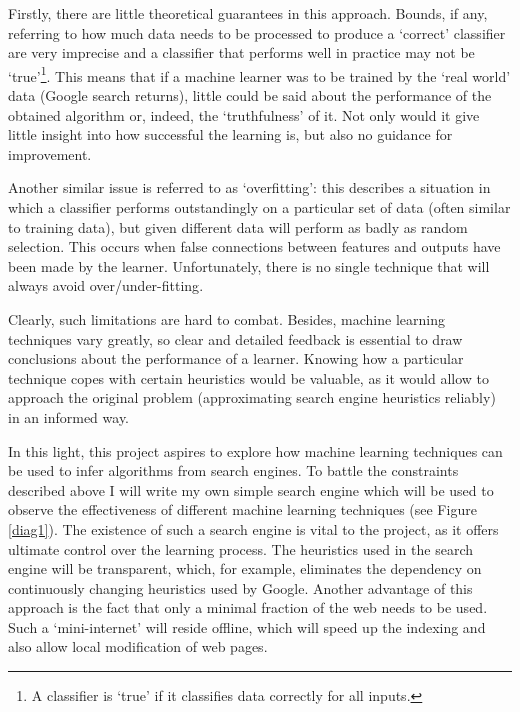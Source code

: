 Firstly, there are little theoretical guarantees in this approach. Bounds, if any, referring to how much data needs to be processed to produce a `correct' classifier are very imprecise and a classifier that performs well in practice may not be `true'\footnote{A classifier is `true' if it classifies data correctly for all inputs.}. This means that if a machine learner was to be trained by the `real world' data (Google search returns), little could be said about the performance of the obtained algorithm or, indeed, the `truthfulness' of it. Not only would it give little insight into how successful the learning is, but also no guidance for improvement. 

Another similar issue is referred to as `overfitting': this describes a situation in which a classifier performs outstandingly on a particular set of data (often similar to training data), but given different data will perform as badly as random selection. This occurs when false connections between features and outputs have been made by the learner. Unfortunately, there is no single technique that will always avoid over/under-fitting\cite{domingos}.

Clearly, such limitations are hard to combat. Besides, machine learning techniques vary greatly, so clear and detailed feedback is essential to draw conclusions about the performance of a learner. Knowing how a particular technique copes with certain heuristics would be valuable, as it would allow to approach the original problem (approximating search engine heuristics reliably) in an informed way.  

In this light, this project aspires to explore how machine learning techniques can be used to infer algorithms from search engines. To battle the constraints described above I will write my own simple search engine which will be used to observe the effectiveness of different machine learning techniques (see Figure \ref{diag1}). The existence of such a search engine is vital to the project, as it offers ultimate control over the learning process. The heuristics used in the search engine will be transparent, which, for example, eliminates the dependency on continuously changing heuristics used by Google. Another advantage of this approach is the fact that only a minimal fraction of the web needs to be used. Such a `mini-internet' will reside offline, which will speed up the indexing and also allow local modification of web pages. 

